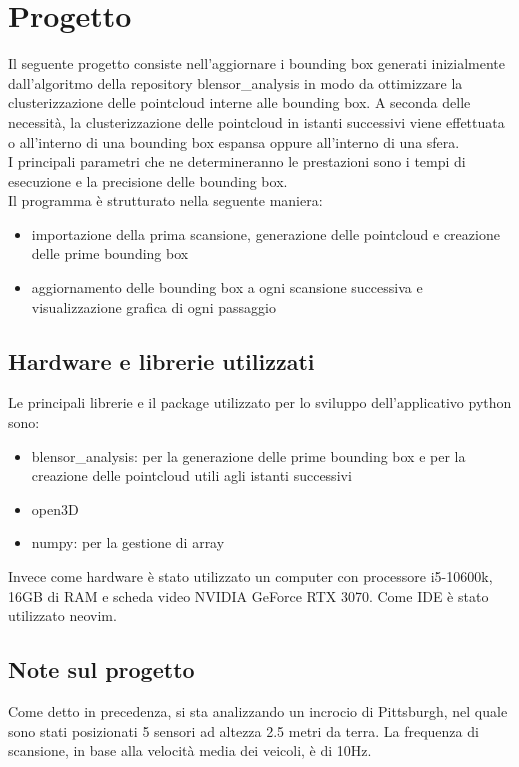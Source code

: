 \documentclass[italian]{article}
\begin{document}
\section*{Progetto}
Il seguente progetto consiste nell'aggiornare i bounding box generati inizialmente dall'algoritmo della repository blensor\_analysis in modo da ottimizzare la clusterizzazione delle pointcloud interne alle bounding box. A seconda delle necessità, la clusterizzazione delle pointcloud in istanti successivi viene effettuata o all'interno di una bounding box espansa oppure all'interno di una sfera.\\
I principali parametri che ne determineranno le prestazioni sono i tempi di esecuzione e la precisione delle bounding box.\\ %
Il programma è strutturato nella seguente maniera:
\begin{itemize}
	\item importazione della prima scansione, generazione delle pointcloud e creazione delle prime bounding box
	\item aggiornamento delle bounding box a ogni scansione successiva e visualizzazione grafica di ogni passaggio
\end{itemize}
\subsection{Hardware e librerie utilizzati}
Le principali librerie e il package utilizzato per lo sviluppo dell'applicativo python sono:
\begin{itemize}
	\item blensor\_analysis: per la generazione delle prime bounding box e per la creazione delle pointcloud utili agli istanti successivi
	\item open3D
	\item numpy: per la gestione di array
\end{itemize}
Invece come hardware è stato utilizzato un computer con processore i5-10600k, 16GB di RAM e scheda video NVIDIA GeForce RTX 3070. Come IDE è stato utilizzato neovim.
\subsection{Note sul progetto}
Come detto in precedenza, si sta analizzando un incrocio di Pittsburgh, nel quale sono stati posizionati 5 sensori ad altezza 2.5 metri da terra. La frequenza di scansione, in base alla velocità media dei veicoli, è di 10Hz.\\
\end{document}
